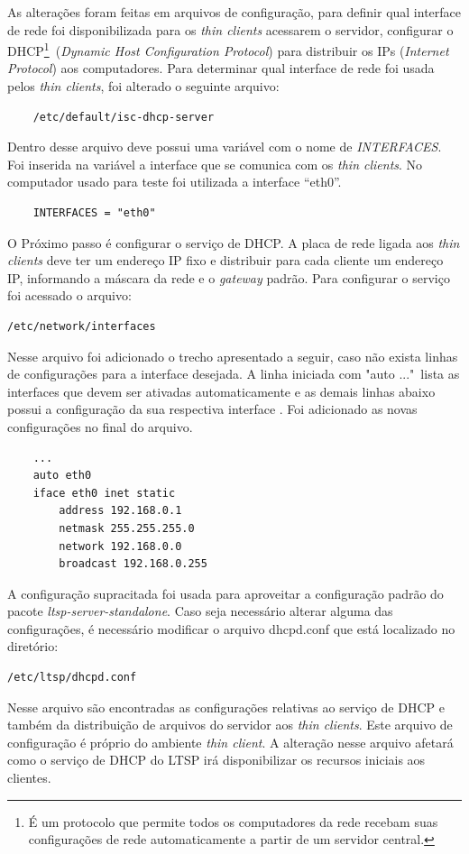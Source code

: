\documentclass[
	12pt,				%
	openright,			%
	twoside,			%
	a4paper,			%
	chapter=TITLE,		%
	english,			%
	brazil				%
	]{abntex2}
\begin{document}
As alterações foram feitas em arquivos de configuração, para definir qual interface de rede foi disponibilizada para os \textit{thin clients} acessarem o servidor,  configurar o DHCP\footnote{É um protocolo que permite todos os computadores da rede recebam suas configurações de rede automaticamente a partir de um servidor central\cite{dhcp}.}\ (\textit{Dynamic Host Configuration Protocol}) para distribuir os IPs (\textit{Internet Protocol}) aos computadores. Para determinar qual interface de rede foi usada pelos \textit{thin clients}, foi alterado o seguinte arquivo:
\begin{verbatim}
	/etc/default/isc-dhcp-server
\end{verbatim}  
Dentro desse arquivo deve possui uma variável com o nome de \textit{INTERFACES}. Foi inserida na variável a interface que se comunica com os \textit{thin clients}. No computador usado para teste foi utilizada a interface “eth0”.
\begin{verbatim}
	INTERFACES = "eth0"
\end{verbatim}

O Próximo passo é configurar o serviço de DHCP. A placa de rede ligada aos \textit{thin clients} deve ter um endereço IP fixo e distribuir para cada cliente um endereço IP, informando a máscara da rede e o \textit{gateway} padrão. Para configurar o serviço foi acessado o arquivo: 
\begin{verbatim}
/etc/network/interfaces
\end{verbatim} 
Nesse arquivo foi adicionado o trecho apresentado a seguir, caso não exista linhas de configurações para a interface desejada. A linha iniciada com "auto ..."\ lista as interfaces que devem ser ativadas automaticamente e as demais linhas abaixo possui a configuração da sua respectiva interface \cite{ClubeHardware,LTSP5}. Foi adicionado as novas configurações no final do arquivo. 
\begin{verbatim}
	...
	auto eth0  
	iface eth0 inet static
		address 192.168.0.1
		netmask 255.255.255.0
		network 192.168.0.0
		broadcast 192.168.0.255
\end{verbatim}
A configuração supracitada foi usada para aproveitar a configuração padrão  do pacote \textit{ltsp-server-standalone}. Caso seja necessário alterar alguma das configurações, é necessário modificar o arquivo dhcpd.conf que está localizado no diretório:
\begin{verbatim}
/etc/ltsp/dhcpd.conf
\end{verbatim}
Nesse arquivo são encontradas as configurações relativas ao serviço de DHCP e também da distribuição de arquivos do servidor aos \textit{thin clients}. Este arquivo de configuração é próprio do ambiente \textit{thin client}. A alteração nesse arquivo afetará como o  serviço de DHCP do LTSP irá disponibilizar os recursos iniciais aos clientes.
\end{document}

